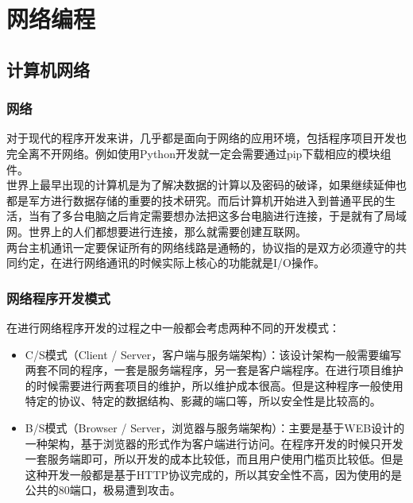 \chapter{网络编程}

\section{计算机网络}

\subsection{网络}

对于现代的程序开发来讲，几乎都是面向于网络的应用环境，包括程序项目开发也完全离不开网络。例如使用Python开发就一定会需要通过pip下载相应的模块组件。\\

世界上最早出现的计算机是为了解决数据的计算以及密码的破译，如果继续延伸也都是军方进行数据存储的重要的技术研究。而后计算机开始进入到普通平民的生活，当有了多台电脑之后肯定需要想办法把这多台电脑进行连接，于是就有了局域网。世界上的人们都想要进行连接，那么就需要创建互联网。\\

两台主机通讯一定要保证所有的网络线路是通畅的，协议指的是双方必须遵守的共同约定，在进行网络通讯的时候实际上核心的功能就是I/O操作。\\

\subsection{网络程序开发模式}

在进行网络程序开发的过程之中一般都会考虑两种不同的开发模式：

\begin{itemize}
	\item C/S模式（Client / Server，客户端与服务端架构）：该设计架构一般需要编写两套不同的程序，一套是服务端程序，另一套是客户端程序。在进行项目维护的时候需要进行两套项目的维护，所以维护成本很高。但是这种程序一般使用特定的协议、特定的数据结构、影藏的端口等，所以安全性是比较高的。

	\item B/S模式（Browser / Server，浏览器与服务端架构）：主要是基于WEB设计的一种架构，基于浏览器的形式作为客户端进行访问。在程序开发的时候只开发一套服务端即可，所以开发的成本比较低，而且用户使用门槛页比较低。但是这种开发一般都是基于HTTP协议完成的，所以其安全性不高，因为使用的是公共的80端口，极易遭到攻击。
\end{itemize}

